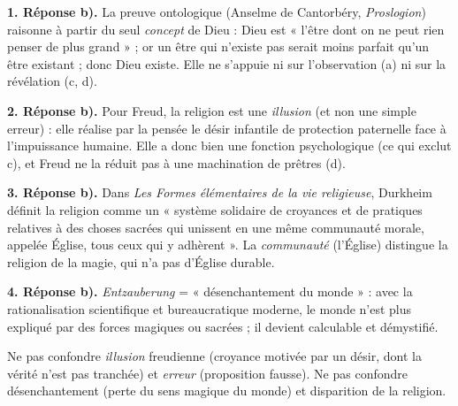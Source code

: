 \documentclass[11pt]{article}
\begin{document}
\begin{corrige}

\textbf{1. Réponse b).} La preuve ontologique (Anselme de Cantorbéry, \emph{Proslogion}) raisonne à partir du seul \emph{concept} de Dieu : Dieu est « l'être dont on ne peut rien penser de plus grand » ; or un être qui n'existe pas serait moins parfait qu'un être existant ; donc Dieu existe. Elle ne s'appuie ni sur l'observation (a) ni sur la révélation (c, d).

\textbf{2. Réponse b).} Pour Freud, la religion est une \emph{illusion} (et non une simple erreur) : elle réalise par la pensée le désir infantile de protection paternelle face à l'impuissance humaine. Elle a donc bien une fonction psychologique (ce qui exclut c), et Freud ne la réduit pas à une machination de prêtres (d).

\textbf{3. Réponse b).} Dans \emph{Les Formes élémentaires de la vie religieuse}, Durkheim définit la religion comme un « système solidaire de croyances et de pratiques relatives à des choses sacrées qui unissent en une même communauté morale, appelée Église, tous ceux qui y adhèrent ». La \emph{communauté} (l'Église) distingue la religion de la magie, qui n'a pas d'Église durable.

\textbf{4. Réponse b).} \emph{Entzauberung} = « désenchantement du monde » : avec la rationalisation scientifique et bureaucratique moderne, le monde n'est plus expliqué par des forces magiques ou sacrées ; il devient calculable et démystifié.
\end{corrige}
\begin{attention}
Ne pas confondre \emph{illusion} freudienne (croyance motivée par un désir, dont la vérité n'est pas tranchée) et \emph{erreur} (proposition fausse). Ne pas confondre désenchantement (perte du sens magique du monde) et disparition de la religion.
\end{attention}
\end{document}
